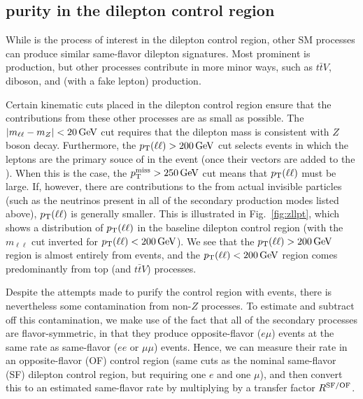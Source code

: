 \subsection{\zll purity in the dilepton control region}
\label{sec:dilep_bkgs}
While \zll is the process of interest in the dilepton control region, other SM processes can
produce similar same-flavor dilepton signatures. Most prominent is \ttbar production, but other
processes contribute in more minor ways, such as $t\bar{t}V$, diboson, and \wjets (with a fake
lepton) production.

Certain kinematic cuts placed in the dilepton control region ensure that the contributions
from these other processes are as small as possible. The $|m_{\ell\ell}-m_Z|<20\,\text{Ge\hspace{-.08em}V}$ cut requires
that the dilepton mass is consistent with $Z$ boson decay. Furthermore, the $p_{\mathrm{T}}(\ell\ell)>200\,\text{Ge\hspace{-.08em}V}$ cut
selects events in which the leptons are the primary souce of \ptmiss in the event (once their 
vectors are added to the \vMet). When this is the case, the $p_{\mathrm{T}}^{\mathrm{miss}}>250\,\text{Ge\hspace{-.08em}V}$ cut means that
$p_{\mathrm{T}}(\ell\ell)$ must be large. If, however, there are contributions to the \ptmiss from actual
invisible particles (such as the neutrinos present in all of the secondary production modes listed above),
$p_{\mathrm{T}}(\ell\ell)$ is generally smaller. This is illustrated in Fig.~\ref{fig:zllpt}, which shows a distribution
of $p_{\mathrm{T}}(\ell\ell)$ in the baseline dilepton control region (with the $m_{\ell\ell}$ cut inverted for
$p_{\mathrm{T}}(\ell\ell)<200\,\text{Ge\hspace{-.08em}V}$). We see that the $p_{\mathrm{T}}(\ell\ell)>200\,\text{Ge\hspace{-.08em}V}$ region is almost entirely from \zll events,
and the $p_{\mathrm{T}}(\ell\ell)<200\,\text{Ge\hspace{-.08em}V}$ region comes predominantly from top (\ttbar and $t\bar{t}V$) processes.

Despite the attempts made to purify the control region with \zll events, there is nevertheless some contamination
from non-$Z$ processes. To estimate and subtract off this contamination, we make use of the fact that
all of the secondary processes are flavor-symmetric, in that they produce opposite-flavor ($e\mu$) events
at the same rate as same-flavor ($ee$ or $\mu\mu$) events. Hence, we can measure their rate in an 
opposite-flavor (OF) control region (same cuts as the nominal same-flavor (SF) dilepton control region, but 
requiring one $e$ and one $\mu$), and then convert this to an estimated same-flavor rate by 
multiplying by a transfer factor $R^{\mathrm{SF/OF}}$.

